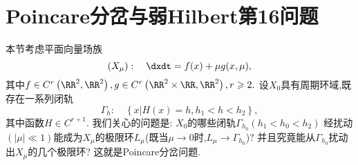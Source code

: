 \section{Poincare分岔与弱Hilbert第16问题}
本节考虑平面向量场族
\begin{equation}
  \label{eq:2.5.1}
  \left(X_{\mu}\right): \quad \dxdt=f(x)+\mu g(x, \mu),
\end{equation}
其中$f \in C^{r}\left(\RR^{2}, \RR^{2}\right), g \in C^{r}\left(\RR^{2} \times \RR, \RR^{2}\right), r \geqslant 2.$
设$X_0$具有周期环域,既存在一系列闭轨
$$
\Gamma_{h}: \quad\left\{x | H(x)=h, h_{1}<h<h_{2}\right\},
$$
其中函数$H \in C^{r+1}.$
我们关心的问题是:
$X_0$的哪些闭轨$\Gamma_{h_{0}}\left(h_{1}<h_0<h_2\right)$
经扰动$(|\mu| \ll 1)$能成为$X_{\mu}$的极限环$L_{\mu}$(既当$\mu \to 0$时,$L_{\mu} \to \Gamma_{h_0}$)?
并且究竟能从$\Gamma_{h_0}$扰动出$X_{\mu}$的几个极限环?
这就是Poincare分岔问题.


